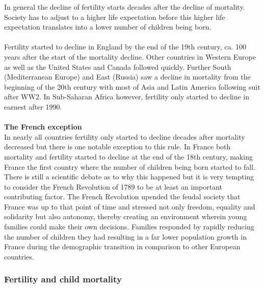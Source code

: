 \documentclass[../summary.tex]{subfiles}
\begin{document}
In general the decline of fertility starts decades after the decline of mortality. Society has to adjust to a higher life expectation before this higher life expectation translates into a lower number of children being born. \\
\\
Fertility started to decline in England by the end of the 19th century, ca. 100 years after the start of the mortality decline. Other countries in Western Europe as well as the United States and Canada followed quickly. Further South (Mediterranean Europe) and East (Russia) saw a decline in mortality from the beginning of the 20th century with most of Asia and Latin America following suit after WW2. In Sub-Saharan Africa however, fertility only started to decline in earnest after 1990. \\
\\
\textbf{The French exception}\\
In nearly all countries fertility only started to decline decades after mortality decreased but there is one notable exception to this rule. In France both mortality and fertility started to decline at the end of the 18th century, making France the first country where the number of children being born started to fall. There is still a scientific debate as to why this happened but it is very tempting to consider the French Revolution of 1789 to be at least an important contributing factor. The French Revolution upended the feudal society that France was up to that point of time and stressed not only freedom, equality and solidarity but also autonomy, thereby creating an environment wherein young families could make their own decisions. Families responded by rapidly reducing the number of children they had resulting in a far lower population growth in France during the demographic transition in comparison to other European countries.
\newpage

\subsubsection{Fertility and child mortality}
\end{document}
